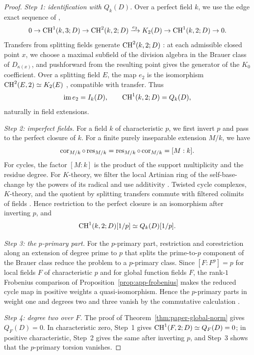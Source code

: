 \begin{proof}
\emph{Step 1: identification with $Q_k(D)$.}
Over a perfect field $k$, we use the edge exact sequence of \cite[Theorem 6.7.1(2)]{KahnLevine2010},
\[
 0\to\operatorname{CH}^1(k,3;D)\to\operatorname{CH}^2(k,2;D)\xrightarrow{e_2}K_2(D)
 \to\operatorname{CH}^1(k,2;D)\to0.
\]
Transfers from splitting fields generate $\operatorname{CH}^2(k,2;D)$ \cite[Lemmas 6.6.2--6.6.4]{KahnLevine2010}: at each admissible closed point $x$, we choose a maximal subfield of the division algebra in the Brauer class of $D_{\kappa(x)}$, and pushforward from the resulting point gives the generator of the $K_0$ coefficient.
Over a splitting field $E$, the map $e_2$ is the isomorphism $\operatorname{CH}^2(E,2)\simeq K_2(E)$ \cite{NesterenkoSuslin}, compatible with transfer.
Thus
\[
 \operatorname{im} e_2=I_k(D),\qquad \operatorname{CH}^1(k,2;D)=Q_k(D),
\]
naturally in field extensions.

\emph{Step 2: imperfect fields.}
For a field $k$ of characteristic $p$, we first invert $p$ and pass to the perfect closure of $k$.
For a finite purely inseparable extension $M/k$, we have
\[
 \operatorname{cor}_{M/k}\circ\operatorname{res}_{M/k}=\operatorname{res}_{M/k}\circ\operatorname{cor}_{M/k}=[M:k].
\]
For cycles, the factor $[M:k]$ is the product of the support multiplicity and the residue degree.
For $K$-theory, we filter the local Artinian ring of the self-base-change by the powers of its radical and use additivity \cite{QuillenHigher}.
Twisted cycle complexes, $K$-theory, and the quotient by splitting transfers commute with filtered colimits of fields \cite{KahnLevine2010}.
Hence restriction to the perfect closure is an isomorphism after inverting $p$, and
\[
 \operatorname{CH}^1(k,2;D)[1/p]\simeq Q_k(D)[1/p].
\]

\emph{Step 3: the $p$-primary part.}
For the $p$-primary part, restriction and corestriction along an extension of degree prime to $p$ that splits the prime-to-$p$ component of the Brauer class reduce the problem to a $p$-primary class.
Since $[F:F^p]=p$ for local fields $F$ of characteristic $p$ and for global function fields $F$, the rank-$1$ Frobenius comparison of Proposition~\ref{prop:app-frobenius} makes the reduced cycle map in positive weights a quasi-isomorphism.
Hence the $p$-primary parts in weight one and degrees two and three vanish by the commutative calculation \cite[Proposition 6.8.1]{KahnLevine2010}.

\emph{Step 4: degree two over $F$.}
The proof of Theorem~\ref{thm:paper-global-norm} gives $Q_F(D)=0$.
In characteristic zero, Step~1 gives $\operatorname{CH}^1(F,2;D)\simeq Q_F(D)=0$; in positive characteristic, Step~2 gives the same after inverting $p$, and Step~3 shows that the $p$-primary torsion vanishes.


\end{proof}
